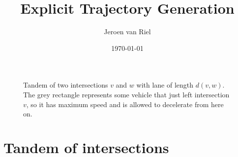 \documentclass[a4paper]{article}
\author{Jeroen van Riel}
\date{\monthyeardate\today}
\title{Explicit Trajectory Generation}
\theoremstyle{definition}
\theoremstyle{plain}
\begin{document}
\begin{figure}
  \centering
  \caption{Tandem of two intersections $v$ and $w$ with lane of length $d(v,w)$.
    The grey rectangle represents some vehicle that just left intersection $v$,
    so it has maximum speed and is allowed to decelerate from here on.}
  \label{fig:tandem}
\end{figure}

\section{Tandem of intersections}
\end{document}
